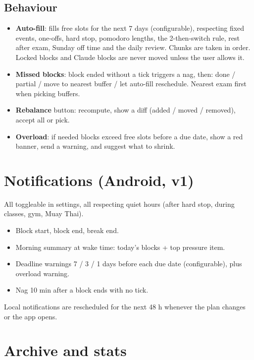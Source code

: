 \documentclass[11pt,a4paper]{article}
\begin{document}
\subsection*{Behaviour}
\begin{itemize}
  \item \textbf{Auto-fill}: fills free slots for the next 7 days (configurable), respecting fixed events, one-offs, hard stop, pomodoro lengths, the 2-then-switch rule, rest after exam, Sunday off time and the daily review. Chunks are taken in order. Locked blocks and Claude blocks are never moved unless the user allows it.
  \item \textbf{Missed blocks}: block ended without a tick triggers a nag, then: done / partial / move to nearest buffer / let auto-fill reschedule. Nearest exam first when picking buffers.
  \item \textbf{Rebalance} button: recompute, show a diff (added / moved / removed), accept all or pick.
  \item \textbf{Overload}: if needed blocks exceed free slots before a due date, show a red banner, send a warning, and suggest what to shrink.
\end{itemize}

\section{Notifications (Android, v1)}

All toggleable in settings, all respecting quiet hours (after hard stop, during classes, gym, Muay Thai).
\begin{itemize}
  \item Block start, block end, break end.
  \item Morning summary at wake time: today's blocks + top pressure item.
  \item Deadline warnings 7 / 3 / 1 days before each due date (configurable), plus overload warning.
  \item Nag 10 min after a block ends with no tick.
\end{itemize}
Local notifications are rescheduled for the next 48 h whenever the plan changes or the app opens.

\section{Archive and stats}
\end{document}
